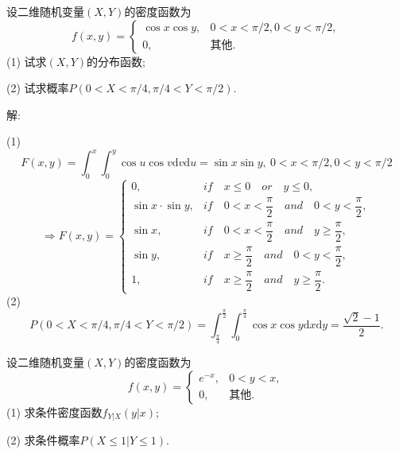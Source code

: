 \documentclass[standard]{ExBook}
\renewenvironment{shaded}{%
  \def\FrameCommand{\fboxsep=\FrameSep \colorbox{shadecolor}}%
  \MakeFramed{\advance\hsize-\width \FrameRestore}%
}{%
  \endMakeFramed
}
\begin{document}
\begin{qitems}
\vspace{2.5cm-5em}

    \begin{bbox}
    \begin{shaded}
        \qitem
设二维随机变量$(X,Y)$的密度函数为
$$
    f(x,y)=
    \left\{
    \begin{array}{ll}
        \cos x\cos y, &0 < x < \pi/2, 0 < y < \pi/2,\\
        0, &\text{其他}.
    \end{array}
    \right.
$$
(1) 试求$(X,Y)$的分布函数;

(2) 试求概率$P(0<X<\pi/4,\pi/4<Y<\pi/2)$.
    \end{shaded}
    \end{bbox}

\vspace{\dimexpr2.5cm-5em\relax}

解: 

(1) $$F(x,y)=\displaystyle\int_{0}^{x}\int_{0}^{y}\cos u\cos v\mathrm{d}v\mathrm{d}u=\sin x\sin y,\ 0 < x < \pi/2, 0 < y < \pi/2$$
\[
\Longrightarrow
F(x,y) = 
\begin{cases}
0, & if\quad x \leq 0\quad or\quad y \leq 0, \\
\sin x \cdot \sin y, & if\quad 0 < x < \dfrac{\pi}{2}\quad and\quad 0 < y < \dfrac{\pi}{2}, \\
\sin x, & if\quad 0 < x < \dfrac{\pi}{2}\quad and\quad y \geq \dfrac{\pi}{2}, \\
\sin y, & if\quad x \geq \dfrac{\pi}{2}\quad and\quad 0 < y < \dfrac{\pi}{2}, \\
1, & if\quad x \geq \dfrac{\pi}{2}\quad and\quad y \geq \dfrac{\pi}{2}.
\end{cases}
\]
(2) $$P(0<X<\pi/4,\pi/4<Y<\pi/2)=\displaystyle\int_{\frac{\pi}{4}}^{\frac{\pi}{2}}\int_{0}^{\frac{\pi}{4}}\cos x\cos y\mathrm{d}x\mathrm{d}y=\displaystyle\frac{\sqrt{2}-1}{2}.$$

\vspace{2.5cm-5em}

    \begin{bbox}
    \begin{shaded}
        \qitem
设二维随机变量$(X,Y)$的密度函数为
$$
    f(x,y)=
    \left\{
    \begin{array}{ll}
        e^{-x}, &0 < y < x,\\
        0, &\text{其他}.
    \end{array}
    \right.
$$
(1) 求条件密度函数$f_{Y|X}(y|x)$;

(2) 求条件概率$P(X\leq1|Y\leq1)$.
    \end{shaded}
    \end{bbox}


\end{qitems}
\end{document}

